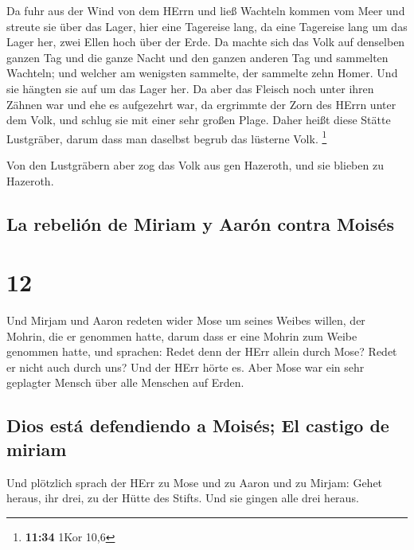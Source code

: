  Da fuhr aus der Wind von dem HErrn und ließ Wachteln
kommen vom Meer und streute sie über das Lager, hier eine Tagereise
lang, da eine Tagereise lang um das Lager her, zwei Ellen hoch über der
Erde.  Da machte sich das Volk auf denselben ganzen Tag
und die ganze Nacht und den ganzen anderen Tag und sammelten Wachteln;
und welcher am wenigsten sammelte, der sammelte zehn Homer. Und sie
hängten sie auf um das Lager her.  Da aber das Fleisch
noch unter ihren Zähnen war und ehe es aufgezehrt war, da ergrimmte der
Zorn des HErrn unter dem Volk, und schlug sie mit einer sehr großen
Plage.  Daher heißt diese Stätte Lustgräber, darum dass
man daselbst begrub das lüsterne Volk. \footnote{\textbf{11:34} 1Kor
  10,6}

 Von den Lustgräbern aber zog das Volk aus gen Hazeroth,
und sie blieben zu Hazeroth.

\hypertarget{la-rebeliuxf3n-de-miriam-y-aaruxf3n-contra-moisuxe9s}{%
\subsection{La rebelión de Miriam y Aarón contra
Moisés}\label{la-rebeliuxf3n-de-miriam-y-aaruxf3n-contra-moisuxe9s}}

\hypertarget{section-11}{%
\section{12}\label{section-11}}

 Und Mirjam und Aaron redeten wider Mose um seines Weibes
willen, der Mohrin, die er genommen hatte, darum dass er eine Mohrin zum
Weibe genommen hatte,  und sprachen: Redet denn der HErr
allein durch Mose? Redet er nicht auch durch uns? Und der HErr hörte es.
 Aber Mose war ein sehr geplagter Mensch über alle
Menschen auf Erden.

\hypertarget{dios-estuxe1-defendiendo-a-moisuxe9s-el-castigo-de-miriam}{%
\subsection{Dios está defendiendo a Moisés; El castigo de
miriam}\label{dios-estuxe1-defendiendo-a-moisuxe9s-el-castigo-de-miriam}}

 Und plötzlich sprach der HErr zu Mose und zu Aaron und zu
Mirjam: Gehet heraus, ihr drei, zu der Hütte des Stifts. Und sie gingen
alle drei heraus.

